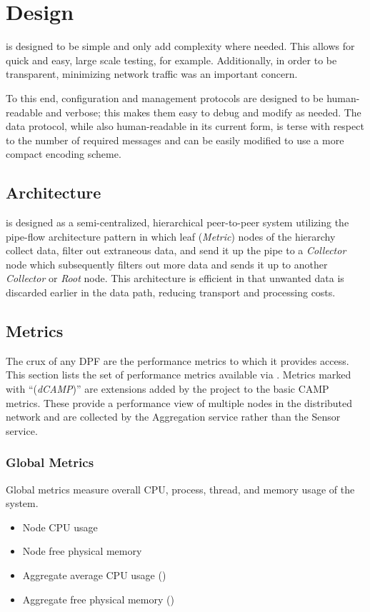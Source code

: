 \chapter{Design}
\label{design}

\dcamp is designed to be simple and only add complexity where needed. This allows for quick and easy, large scale
testing, for example. Additionally, in order to be transparent, minimizing network traffic was an important concern.

To this end, \dcamp configuration and management protocols are designed to be human-readable and verbose; this makes
them easy to debug and modify as needed. The data protocol, while also human-readable in its current form, is terse with
respect to the number of required messages and can be easily modified to use a more compact encoding scheme.

\section{Architecture}

\dcamp is designed as a semi-centralized, hierarchical peer-to-peer system utilizing the pipe-flow architecture
pattern\cite{needed} in which leaf (\textit{Metric}) nodes of the hierarchy collect data, filter out extraneous data,
and send it up the pipe to a \textit{Collector} node which subsequently filters out more data and sends it up to another
\textit{Collector} or \textit{Root} node. This architecture is efficient in that unwanted data is discarded earlier in
the data path, reducing transport and processing costs.

\section{\dcamp Metrics}
\label{dcamp_metrics}

The crux of any DPF are the performance metrics to which it provides access. This section lists the set of performance
metrics available via \dcamp. Metrics marked with ``(\emph{dCAMP})'' are extensions added by the \dcamp project to the
basic CAMP metrics. These provide a performance view of multiple nodes in the distributed network and are collected by
the Aggregation service rather than the Sensor service.

\subsection{Global Metrics}
Global metrics measure overall CPU, process, thread, and memory usage of the system.
\begin{itemize}
\item Node CPU usage
\item Node free physical memory
\item Aggregate average CPU usage (\dcamp)
\item Aggregate free physical memory (\dcamp)
\end{itemize}

